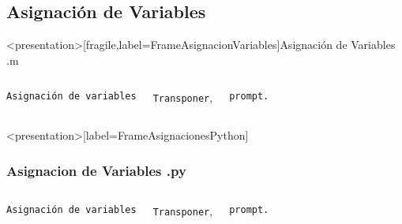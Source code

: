 
\subsection{Asignación de Variables}

\mode*
\begin{frame}<presentation>[fragile,label=FrameAsignacionVariables]{Asignación de Variables .m}

\begin{columns}[T]

 \vspace{0.5cm}

\hfill \texttt{Asignación de variables}

\vspace{1cm}

\hfill \texttt{Transponer},

\vspace{1cm}

\hfill \texttt{prompt.}

\begin{codeblock}
  
\end{codeblock}

\end{columns}
\end{frame}

\begin{frame}<presentation>[label=FrameAsignacionesPython]
  \frametitle{Asignacion de Variables .py}
\begin{columns}[T]

 \vspace{0.5cm}

\flushright \texttt{Asignación de variables}

\vspace{1cm}

\hfill \texttt{Transponer},

\vspace{1cm}

\hfill \texttt{prompt.}

\begin{codeblock}
  
\end{codeblock}

\end{columns}

\end{frame}

